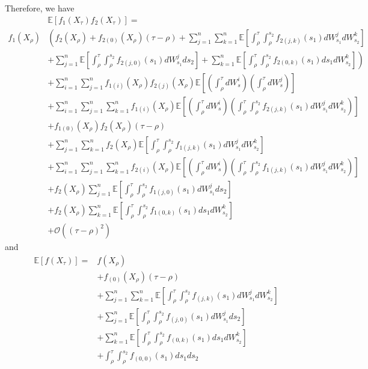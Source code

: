 \documentclass[12pt]{article}
\begin{document}
Therefore, we have
\begin{equation}
\begin{aligned}
&\mathbb{E} \left[ f_1(X_\tau) f_2(X_\tau) \right] = \\
 f_1(X_\rho) & \left( f_2(X_\rho) 
  + f_{2(0)} (X_\rho) (\tau - \rho) 
  + \sum_{j=1}^n \sum_{k=1}^n \mathbb{E} \left[ \int_\rho^\tau \int_\rho^{s_2} f_{2(j,k)} (s_1) dW_{s_1}^j dW_{s_2}^k \right] \right. \\
& \left. + \sum_{j=1}^n \mathbb{E} \left[ \int_\rho^\tau \int_\rho^{s_2} f_{2(j,0)} (s_1) dW_{s_1}^j ds_2 \right] 
+ \sum_{k=1}^n \mathbb{E} \left[ \int_\rho^\tau \int_\rho^{s_2} f_{2(0,k)} (s_1) ds_1 dW_{s_2}^k \right]  \right) \\
& +  \sum_{i=1}^n \sum_{j=1}^n f_{1(i)} (X_\rho) f_{2(j)} (X_\rho) \mathbb{E} \left[ \left( \int_\rho^\tau dW_s^i \right) \left( \int_\rho^\tau dW_s^j \right) \right] \\
& + \sum_{i=1}^n \sum_{j=1}^n \sum_{k=1}^n f_{1(i)} (X_\rho) \mathbb{E} \left[ \left( \int_\rho^\tau dW_s^i  \right) \left( \int_\rho^\tau \int_\rho^{s_2} f_{2(j,k)} (s_1) dW_{s_1}^j dW_{s_2}^k  \right) \right] \\
& + f_{1(0)} (X_\rho) f_2(X_\rho) (\tau - \rho) \\
&+ \sum_{j=1}^n \sum_{k=1}^n f_2(X_\rho) \mathbb{E} \left[ \int_\rho^\tau \int_\rho^{s_2} f_{1(j,k)} (s_1) dW_{s_1}^j dW_{s_2}^k \right] \\
& + \sum_{i=1}^n \sum_{j=1}^n \sum_{k=1}^n  f_{2(i)} (X_\rho)  \mathbb{E} \left[ \left( \int_\rho^\tau dW_s^i \right)  \left( \int_\rho^\tau \int_\rho^{s_2} f_{1(j,k)} (s_1) dW_{s_1}^j dW_{s_2}^k \right) \right] \\
& + f_2(X_\rho) \sum_{j=1}^n \mathbb{E} \left[  \int_\rho^\tau \int_\rho^{s_2} f_{1(j,0)} (s_1) dW_{s_1}^j ds_2 \right] \\
& + f_2(X_\rho) \sum_{k=1}^n \mathbb{E} \left[ \int_\rho^\tau \int_\rho^{s_2} f_{1(0,k)} (s_1) ds_1 dW_{s_2}^k \right] \\
&+ \mathcal{O} ((\tau - \rho)^2 ) 
\end{aligned}
\end{equation}
%
and
\begin{equation}
\begin{aligned}
\mathbb{E} [f(X_\tau)] =&  f(X_\rho) \\
& + f_{(0)} (X_\rho) (\tau - \rho) \\
& + \sum_{j=1}^n \sum_{k=1}^n \mathbb{E} \left[ \int_\rho^\tau \int_\rho^{s_2} f_{(j,k)} (s_1) dW_{s_1}^j dW_{s_2}^k  \right]\\
& + \sum_{j=1}^n \mathbb{E} \left[ \int_\rho^\tau \int_\rho^{s_2} f_{(j,0)} (s_1) dW_{s_1}^j ds_2 \right] \\
& + \sum_{k=1}^n \mathbb{E} \left[ \int_\rho^\tau \int_\rho^{s_2} f_{(0,k)} (s_1) ds_1 dW_{s_2}^k \right] \\
& + \int_\rho^\tau \int_\rho^{s_2} f_{(0,0)} (s_1) ds_1 ds_2 
\end{aligned}
\end{equation}
\end{document}
